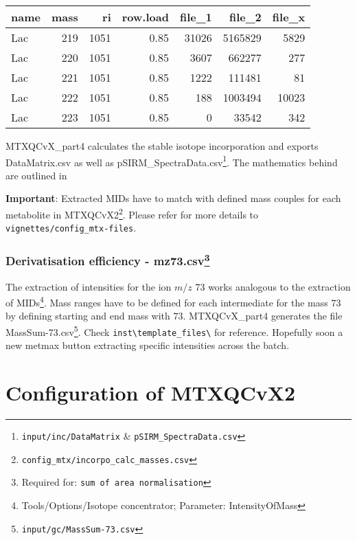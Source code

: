 \documentclass[]{book}
\let\rmarkdownfootnote\footnote%
\def\footnote{\protect\rmarkdownfootnote}
\theoremstyle{definition}
\theoremstyle{definition}
\theoremstyle{definition}
\theoremstyle{remark}
\begin{document}
\begin{tabular}{l|r|r|r|r|r|r}
\hline
name & mass & ri & row.load & file\_1 & file\_2 & file\_x\\
\hline
Lac & 219 & 1051 & 0.85 & 31026 & 5165829 & 5829\\
\hline
Lac & 220 & 1051 & 0.85 & 3607 & 662277 & 277\\
\hline
Lac & 221 & 1051 & 0.85 & 1222 & 111481 & 81\\
\hline
Lac & 222 & 1051 & 0.85 & 188 & 1003494 & 10023\\
\hline
Lac & 223 & 1051 & 0.85 & 0 & 33542 & 342\\
\hline
\end{tabular}

MTXQCvX\_part4 calculates the stable isotope incorporation and exports
DataMatrix.csv as well as pSIRM\_SpectraData.csv\footnote{\texttt{input/inc/DataMatrix}
  \& \texttt{pSIRM\_SpectraData.csv}}. The mathematics behind are
outlined in \citep{Pietzke2014}

\textbf{Important}: Extracted MIDs have to match with defined mass
couples for each metabolite in MTXQCvX2\footnote{\texttt{config\_mtx/incorpo\_calc\_masses.csv}}.
Please refer for more details to \texttt{vignettes/config\_mtx-files}.

\subsection[Derivatisation efficiency -
mz73.csv]{\texorpdfstring{Derivatisation efficiency - mz73.csv\footnote{Required
  for: \texttt{sum\ of\ area\ normalisation}}}{Derivatisation efficiency - mz73.csv}}\label{derivatisation-efficiency---mz73.csv}

The extraction of intensities for the ion \(m/z\) 73 works analogous to
the extraction of MIDs\footnote{Tools/Options/Isotope concentrator;
  Parameter: IntensityOfMass}. Mass ranges have to be defined for each
intermediate for the mass 73 by defining starting and end mass with 73.
MTXQCvX\_part4 generates the file MassSum-73.csv\footnote{\texttt{input/gc/MassSum-73.csv}}.
Check \texttt{inst\textbackslash{}template\_files\textbackslash{}} for
reference. Hopefully soon a new metmax button extracting specific
intensities across the batch.

\chapter{Configuration of MTXQCvX2}\label{config}
\end{document}
